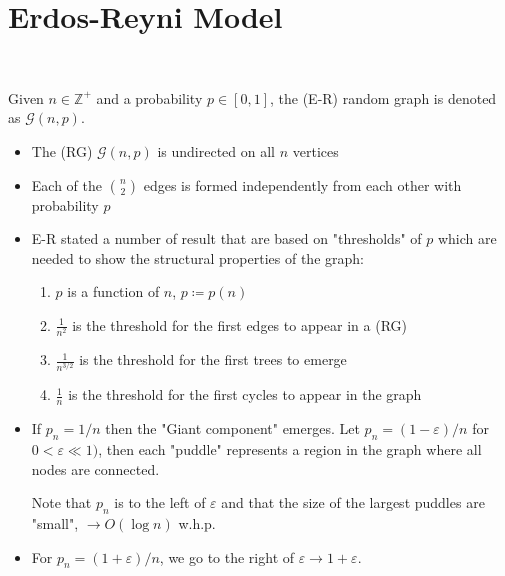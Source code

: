 \section{Erdos-Reyni Model}
\begin{definition}~

	Given $n \in \mathbb{Z}^+$ and a probability $p \in [0,1]$, the (E-R)
	random graph is denoted as $\mathcal{G}(n,p)$.
\end{definition}
\begin{itemize}
	\item The (RG) $\mathcal{G}(n,p)$ is undirected on all $n$ vertices
	\item Each of the $\binom{n}{2}$ edges is formed
	      independently from each other with probability $p$
	\item E-R stated a number of result that are based on "thresholds"
	      of $p$ which are needed to show the structural properties of
	      the graph:
	      \begin{enumerate}
		      \item $p$ is a function of $n$, $p \coloneq p(n)$
		      \item $\frac{1}{n^2}$ is the threshold for the first edges
		            to appear in a (RG)
		      \item $\frac{1}{n^{3/2}}$ is the threshold for the first
		            trees to emerge
		      \item $\frac{1}{n}$ is the threshold for the first cycles
		            to appear in the graph
	      \end{enumerate}
	\item If $p_{n} = 1/n$ then the "Giant component" emerges.
	      Let $p_{n} = (1-\varepsilon)/n$ for $0 < \varepsilon \ll 1)$,
	      then each "puddle" represents a region in the graph
	      where all nodes are connected.
	      \begin{center}
	      \end{center}
	      Note that $p_{n}$ is to the left of $\varepsilon$ and that
	      the size of the largest puddles are "small",
	      $\to O(\log n)$ w.h.p.
	\item For $p_{n} = (1+\varepsilon) / n$, we go to the
	      right of $\varepsilon \to 1 + \varepsilon$.
	      \begin{center}
\end{center}
\end{itemize}
